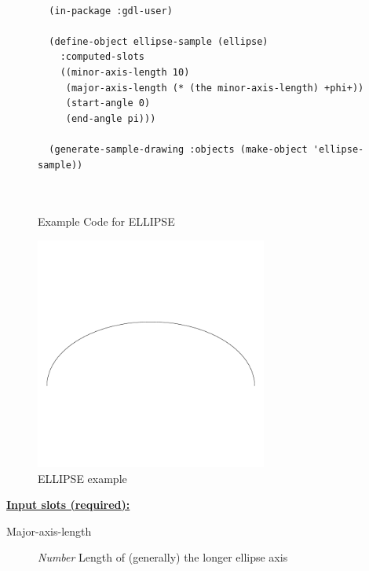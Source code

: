 \documentclass [11pt]{book}
\begin{document}
\begin{itemize}
\begin{figure}
\begin{lrbox}{\boxedverb}
\begin{minipage}{\linewidth}
{\begin{verbatim}
  
  (in-package :gdl-user)

  (define-object ellipse-sample (ellipse)
    :computed-slots
    ((minor-axis-length 10)
     (major-axis-length (* (the minor-axis-length) +phi+))
     (start-angle 0)
     (end-angle pi)))

  (generate-sample-drawing :objects (make-object 'ellipse-sample))
  
  
\end{verbatim}}
\end{minipage}
\end{lrbox}
\fbox{\usebox{\boxedverb}}

\caption{Example Code for ELLIPSE}

\label{fig:example-code-ELLIPSE}

\end{figure}

\begin{figure}
\begin{center}
\includegraphics[width=3in,height=3in]{../images/example-ELLIPSE.pdf}
\end{center}

\caption{ELLIPSE example}

\label{fig:ELLIPSE}

\end{figure}





\textbf{
\underline{Input slots (required):}}

\begin{description}

\item [Major-axis-length]
\emph{Number} Length of (generally) the longer ellipse axis



\end{description}
\end{itemize}
\end{document}
